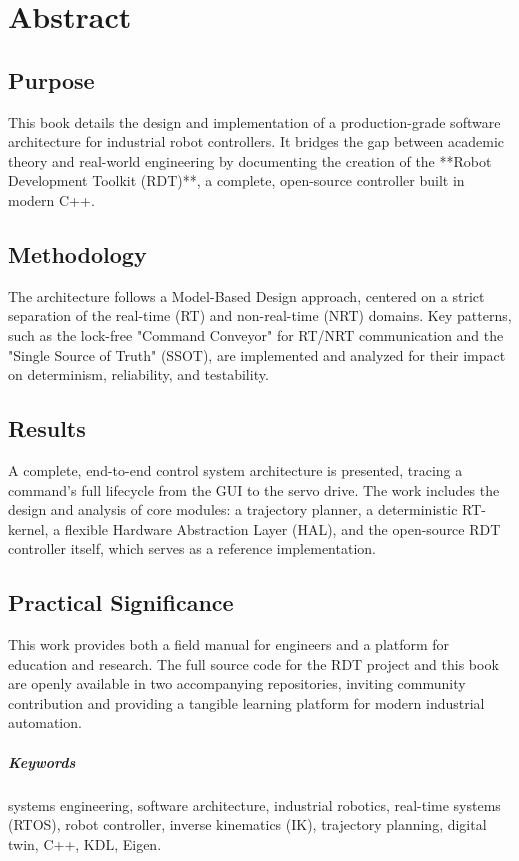 \newpage
\chapter*{Abstract}

\section*{Purpose} 
This book details the design and implementation of a production-grade software architecture for industrial robot controllers. It bridges the gap between academic theory and real-world engineering by documenting the creation of the **Robot Development Toolkit (RDT)**, a complete, open-source controller built in modern C++.


\section*{Methodology} 
The architecture follows a Model-Based Design approach, centered on a strict separation of the real-time (RT) and non-real-time (NRT) domains. Key patterns, such as the lock-free "Command Conveyor" for RT/NRT communication and the "Single Source of Truth" (SSOT), are implemented and analyzed for their impact on determinism, reliability, and testability.


\section*{Results} 
A complete, end-to-end control system architecture is presented, tracing a command's full lifecycle from the GUI to the servo drive. The work includes the design and analysis of core modules: a trajectory planner, a deterministic RT-kernel, a flexible Hardware Abstraction Layer (HAL), and the open-source RDT controller itself, which serves as a reference implementation.


\section*{Practical Significance} 
This work provides both a field manual for engineers and a platform for education and research. The full source code for the RDT project and this book are openly available in two accompanying repositories, inviting community contribution and providing a tangible learning platform for modern industrial automation.

\paragraph*{Keywords} 
systems engineering, software architecture, industrial robotics, real-time systems (RTOS), robot controller, inverse kinematics (IK), trajectory planning, digital twin, C++, KDL, Eigen.